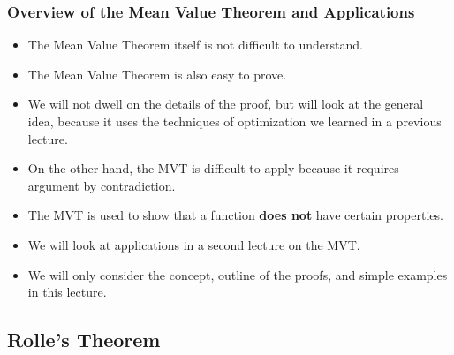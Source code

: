 \documentclass[serif,ignorenonframetext]{beamer}
\begin{document}
\begin{frame}
  \frametitle{Overview of the Mean Value Theorem and Applications}
  \begin{itemize}[<+->]
  \item The Mean Value Theorem itself is not difficult to understand.
  \item The Mean Value Theorem is also easy to prove.
  \item We will not dwell on the details of the proof, but will look
    at the general idea, because it uses the techniques of optimization
    we learned in a previous lecture.
  \item On the other hand, the MVT is difficult to apply because it
    requires argument by contradiction.
  \item The MVT is used to show that a function \textbf{does not} have certain
    properties.
  \item We will look at applications in a second lecture on the MVT.
  \item We will only consider the concept, outline of the 
    proofs, and simple examples in this lecture.
  \end{itemize}
\end{frame}


\subsection{Rolle's Theorem}
\end{document}
